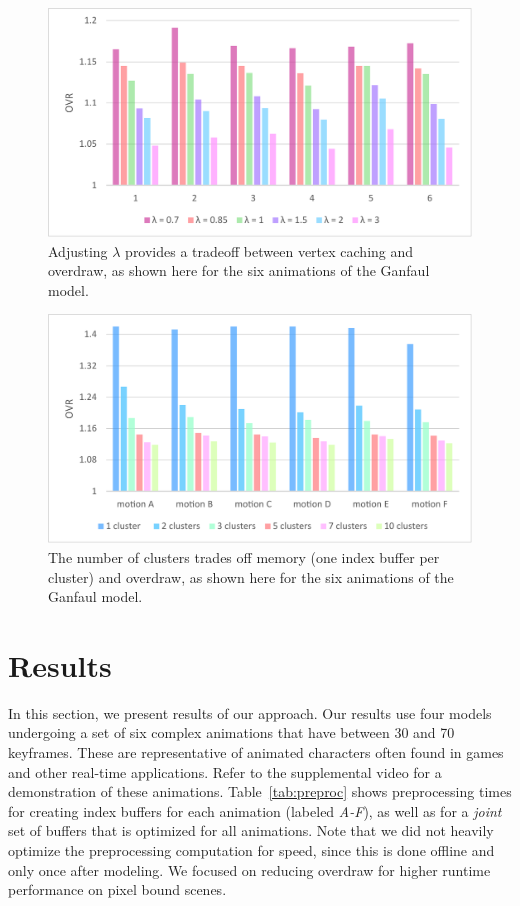 \begin{figure}[t]
\centering
\includegraphics[width = \columnwidth]{plots/alpha.pdf}%
\caption{Adjusting $\lambda$ provides a tradeoff between vertex caching and overdraw, as shown here for the six animations of the Ganfaul model.}
\label{fig:alpha}
\end{figure}

\begin{figure}[t]
\includegraphics[width=\columnwidth]{plots/GanfaulClusters.pdf}
\caption{The number of clusters trades off memory (one index buffer per cluster) and overdraw, as shown here for the six animations of the Ganfaul model.}
\label{fig:clusters}
\end{figure}

\section{Results}
\label{sec:results}

In this section, we present results of our approach.
Our results use four models undergoing a set of six complex animations
that have between 30 and 70 keyframes.  These are representative of animated characters often found in games
and other real-time applications. Refer to the supplemental video for a demonstration of these animations.
Table~\ref{tab:preproc} shows preprocessing times for creating index buffers for each animation (labeled {\em A-F}), as well as
for a {\em joint} set of buffers that is optimized for all animations. Note that we did not heavily optimize
the preprocessing computation for speed, since this is done offline and only once after modeling. We focused on reducing overdraw for higher runtime performance
on pixel bound scenes.

